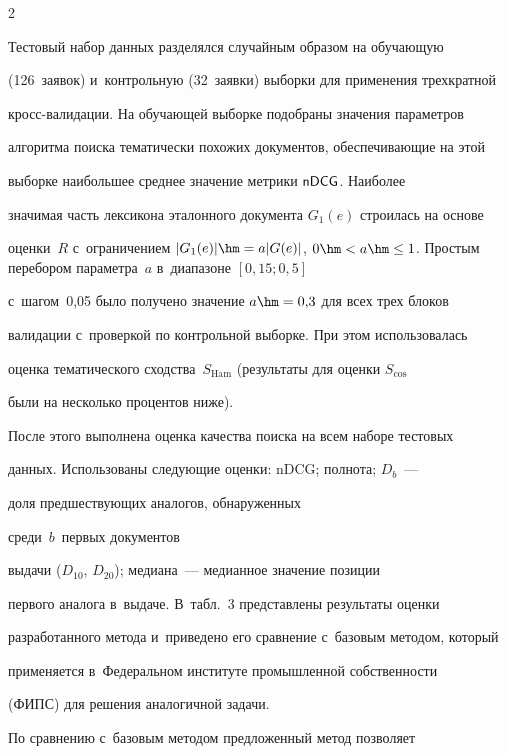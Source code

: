 \begin{multicols}{2}
  

  Тестовый набор данных разделялся случайным образом на обучающую 

(126~заявок) и~контрольную (32~заявки) выборки для применения трехкратной 

кросс-ва\-ли\-да\-ции. На обучающей выборке по\-до\-бра\-ны значения параметров 

алгоритма поиска тематически похожих документов, обеспечивающие на этой 

выборке наибольшее среднее значение мет\-ри\-ки ${\sf nDCG}$. Наиболее 

значимая часть лексикона эталонного документа $G_1(e)$ строилась на основе 

оценки~$R$ с~ограничением $\vert G_1(e)\vert \hm= a\vert G(e)\vert$, $0\hm< 

a\hm\leq 1$. Простым перебором параметра~$a$ в~диапазоне $[0{,}15; 0{,}5]$ 

с~шагом~0,05 было получено значение $a\hm=0{,}3$ для всех трех блоков 

валидации с~проверкой по контрольной выборке. При этом использовалась 

оценка тематического сходства~$S_{\mathrm{Ham}}$ (результаты для оценки $S_{\mathrm{cos}}$ 

были на несколько процентов ниже).

  

  После этого выполнена оценка качества поиска на всем наборе тестовых 

данных. Использованы следующие оценки: {\sf nDCG}; полнота; $D_b$~--- 

доля предшествующих аналогов, обнаруженных\linebreak

 среди~$b$~первых документов 

выдачи ($D_{10}$, $D_{20}$); медиана~--- медианное значение позиции 

первого аналога в~выдаче. В~табл.~3 представлены результаты оценки 

разработанного метода и~приведено его сравнение с~базовым методом, который 

применяется в~Федеральном институте промышленной соб\-ст\-вен\-ности

(ФИПС) для решения аналогичной задачи.





  

  По сравнению с~базовым методом предложенный метод позволяет 


\end{multicols}
